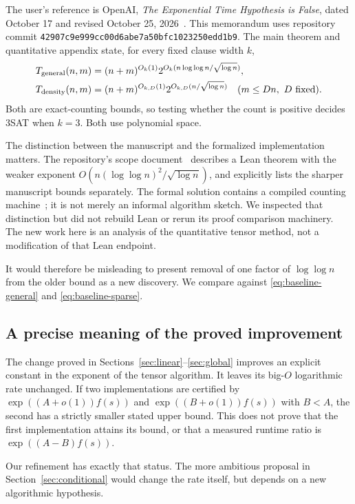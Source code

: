 \documentclass[11pt,letterpaper]{article}
\numberwithin{equation}{section}
\theoremstyle{definition}
\theoremstyle{remark}
\newcommand{\srccommit}{\texttt{42907c9e999cc00d6abe7a50bfc1023250edd1b9}}
\begin{document}
The user's reference is OpenAI, \emph{The Exponential Time Hypothesis is
False}, dated October 17 and revised October 25, 2026~\cite{paper}.
This memorandum uses repository commit \srccommit. The main theorem and
quantitative appendix state, for every fixed clause width $k$,
\begin{align}
 T_{\rm general}(n,m)
  &=(n+m)^{O_k(1)}2^{O_k(n\log\log n/\sqrt{\log n})},
   \label{eq:baseline-general}\\
 T_{\rm density}(n,m)
  &=(n+m)^{O_{k,D}(1)}2^{O_{k,D}(n/\sqrt{\log n})}
       \quad(m\le Dn,\ D\text{ fixed}).\label{eq:baseline-sparse}
\end{align}
Both are exact-counting bounds, so testing whether the count is positive
decides 3SAT when $k=3$. Both use polynomial space.

The distinction between the manuscript and the formalized implementation
matters. The repository's scope document~\cite{scope} describes a Lean theorem
with the weaker exponent $O(n(\log\log n)^2/\sqrt{\log n})$, and explicitly
lists the sharper manuscript bounds separately. The formal solution contains
a compiled counting machine~\cite{leanfinal}; it is not merely an informal
algorithm sketch. We inspected that distinction but did not rebuild Lean or
rerun its proof comparison machinery. The new work here is an analysis of
the quantitative tensor method, not a modification of that Lean endpoint.

It would therefore be misleading to present removal of one factor of
$\log\log n$ from the older bound as a new discovery. We compare against
\eqref{eq:baseline-general} and \eqref{eq:baseline-sparse}.

\subsection{A precise meaning of the proved improvement}

The change proved in Sections~\ref{sec:linear}--\ref{sec:global} improves
an explicit constant in the exponent of the tensor algorithm. It leaves its
big-$O$ logarithmic rate unchanged. If two implementations are certified by
$\exp((A+o(1))f(s))$ and $\exp((B+o(1))f(s))$ with $B<A$, the second has a
strictly smaller stated upper bound. This does not prove that the first
implementation attains its bound, or that a measured runtime ratio is
$\exp((A-B)f(s))$.

Our refinement has exactly that status. The more ambitious proposal in
Section~\ref{sec:conditional} would change the rate itself, but depends on
a new algorithmic hypothesis.
\end{document}
